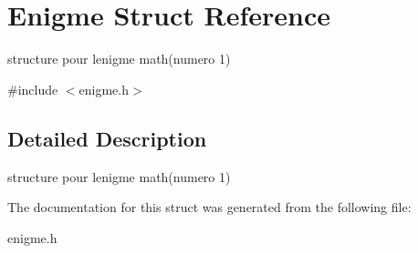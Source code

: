 \hypertarget{structEnigme}{}\section{Enigme Struct Reference}
\label{structEnigme}


structure pour l\textquotesingle{}enigme math(numero 1)  




{\ttfamily \#include $<$enigme.\+h$>$}



\subsection{Detailed Description}
structure pour l\textquotesingle{}enigme math(numero 1) 

The documentation for this struct was generated from the following file\+:\begin{DoxyCompactItemize}
\item 
enigme.\+h\end{DoxyCompactItemize}
